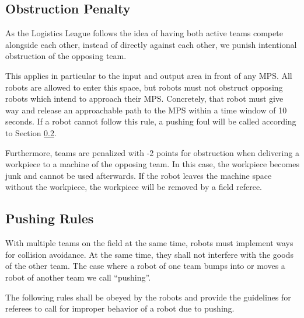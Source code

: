 \documentclass[12pt,twoside]{article}
\begin{document}
\subsection{Obstruction Penalty}
\label{sec:obstruction-penalty}

As the Logistics League follows the idea of having both active teams 
compete alongside each other, instead of directly against each other, we 
punish intentional obstruction of the opposing team.

This applies in particular to the input and output area in front of
any MPS.  All robots are allowed to enter this space, but robots must
not obstruct opposing robots which intend to approach their
MPS. Concretely, that robot must give way and release an approachable
path to the MPS within a time window of 10 seconds. If a robot cannot
follow this rule, a pushing foul will be called according to Section
\ref{sec:pushing-rules}.

Furthermore, teams are penalized with -2 points for obstruction when
delivering a workpiece to a machine of the opposing team.  In this
case, the workpiece becomes junk and cannot be used afterwards. If the
robot leaves the machine space without the workpiece, the workpiece
will be removed by a field referee.

\subsection{Pushing Rules}
\label{sec:pushing-rules}

With multiple teams on the field at the same time, robots must
implement ways for collision avoidance. At the same time, they shall
not interfere with the goods of the other team. The case where a robot
of one team bumps into or moves a robot of another team we
call ``pushing''.

The following rules shall be obeyed by the robots and provide the
guidelines for referees to call for improper behavior of a robot due
to pushing.
\end{document}
